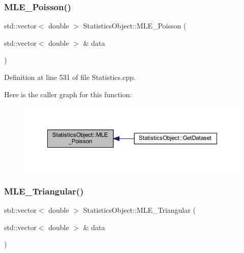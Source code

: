 \subsubsection{\texorpdfstring{M\+L\+E\+\_\+\+Poisson()}{MLE\_Poisson()}}
{\footnotesize\ttfamily std\+::vector$<$ double $>$ Statistics\+Object\+::\+M\+L\+E\+\_\+\+Poisson (\begin{DoxyParamCaption}\item[{std\+::vector$<$ double $>$ \&}]{data }\end{DoxyParamCaption})\hspace{0.3cm}{\ttfamily [protected]}}



Definition at line 531 of file Statistics.\+cpp.

Here is the caller graph for this function\+:\nopagebreak
\begin{figure}[H]
\begin{center}
\leavevmode
\includegraphics[width=350pt]{class_statistics_object_af0888138520ad6df0c1c84cd3862c6c2_icgraph}
\end{center}
\end{figure}
\mbox{\label{class_statistics_object_aecf3e116092cfcfd2a44e1a1936f7b9d}} 
\subsubsection{\texorpdfstring{M\+L\+E\+\_\+\+Triangular()}{MLE\_Triangular()}}
{\footnotesize\ttfamily std\+::vector$<$ double $>$ Statistics\+Object\+::\+M\+L\+E\+\_\+\+Triangular (\begin{DoxyParamCaption}\item[{std\+::vector$<$ double $>$ \&}]{data }\end{DoxyParamCaption})\hspace{0.3cm}{\ttfamily [protected]}}



